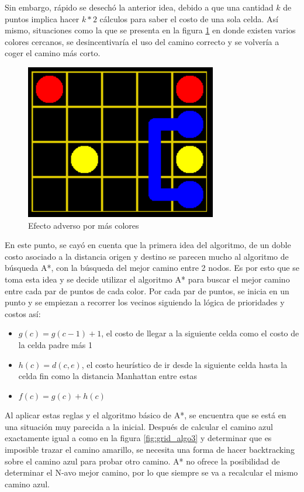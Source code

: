 \documentclass[letter,12pt]{article}
\begin{document}
Sin embargo, rápido se desechó la anterior idea, debido a que una cantidad $k$ de puntos implica hacer $k * 2$ cálculos para saber el costo de una sola celda. Así mismo, situaciones como la que se presenta en la figura \ref{fig:grid_algo5} en donde existen varios colores cercanos, se desincentivaría el uso del camino correcto y se volvería a coger el camino más corto. \par

\begin{figure}[ht!]
    \centering
    \includegraphics[scale=0.7]{img/grid_algo5.png}
    \vspace{-0.5em}
    \caption{Efecto adverso por más colores}
    \label{fig:grid_algo5}
\end{figure}

En este punto, se cayó en cuenta que la primera idea del algoritmo, de un doble costo asociado a la distancia origen y destino se parecen mucho al algoritmo de búsqueda A*, con la búsqueda del mejor camino entre 2 nodos. Es por esto que se toma esta idea y se decide utilizar el algoritmo A* para buscar el mejor camino entre cada par de puntos de cada color. Por cada par de puntos, se inicia en un punto y se empiezan a recorrer los vecinos siguiendo la lógica de prioridades y costos así:

\begin{itemize}
    \item $g(c) = g(c-1) + 1$, el costo de llegar a la siguiente celda como el costo de la celda padre más 1
    \item $h(c) = d(c,e)$, el costo heurístico de ir desde la siguiente celda hasta la celda fin como la distancia Manhattan entre estas
    \item $f(c) = g(c) + h(c)$
\end{itemize}

Al aplicar estas reglas y el algoritmo básico de A*, se encuentra que se está en una situación muy parecida a la inicial. Después de calcular el camino azul exactamente igual a como en la figura \ref{fig:grid_algo3} y determinar que es imposible trazar el camino amarillo, se necesita una forma de hacer backtracking sobre el camino azul para probar otro camino. A* no ofrece la posibilidad de determinar el N-avo mejor camino, por lo que siempre se va a recalcular el mismo camino azul. \par
\end{document}
